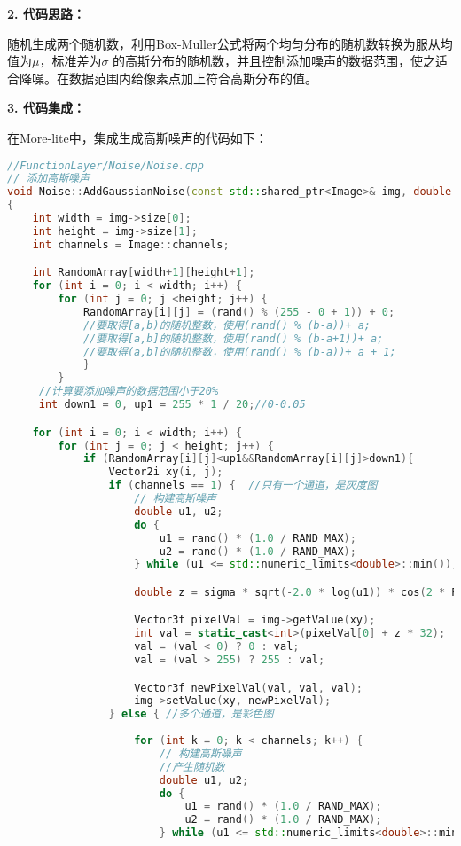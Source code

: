 \documentclass[lang=cn,10pt]{elegantbook}
\begin{document}
\textcolor{third}{\textbf{2. 代码思路：}}

随机生成两个随机数，利用Box-Muller公式将两个均匀分布的随机数转换为服从均值为$\mu$，标准差为$\sigma$ 的高斯分布的随机数，并且控制添加噪声的数据范围，使之适合降噪\cite{zhihu97905713}。在数据范围内给像素点加上符合高斯分布的值。

\textcolor{third}{\textbf{3. 代码集成：}}

在More-lite中，集成生成高斯噪声的代码如下：
\begin{lstlisting}[language=c++]
//FunctionLayer/Noise/Noise.cpp
// 添加高斯噪声
void Noise::AddGaussianNoise(const std::shared_ptr<Image>& img, double mu, double sigma) 
{
    int width = img->size[0];
    int height = img->size[1];
    int channels = Image::channels;

    int RandomArray[width+1][height+1];
    for (int i = 0; i < width; i++) {
        for (int j = 0; j <height; j++) {
			RandomArray[i][j] = (rand() % (255 - 0 + 1)) + 0;
			//要取得[a,b)的随机整数，使用(rand() % (b-a))+ a;   			
			//要取得[a,b]的随机整数，使用(rand() % (b-a+1))+ a;   			
			//要取得(a,b]的随机整数，使用(rand() % (b-a))+ a + 1;   		
		    }
	    }
     //计算要添加噪声的数据范围小于20%
     int down1 = 0, up1 = 255 * 1 / 20;//0-0.05

    for (int i = 0; i < width; i++) {
        for (int j = 0; j < height; j++) {
            if (RandomArray[i][j]<up1&&RandomArray[i][j]>down1){
                Vector2i xy(i, j);            
                if (channels == 1) {  //只有一个通道，是灰度图
                    // 构建高斯噪声
                    double u1, u2;
                    do {
                        u1 = rand() * (1.0 / RAND_MAX);
                        u2 = rand() * (1.0 / RAND_MAX);
                    } while (u1 <= std::numeric_limits<double>::min()); // u1不能为0

                    double z = sigma * sqrt(-2.0 * log(u1)) * cos(2 * PI * u2) + mu;

                    Vector3f pixelVal = img->getValue(xy);
                    int val = static_cast<int>(pixelVal[0] + z * 32);
                    val = (val < 0) ? 0 : val;
                    val = (val > 255) ? 255 : val;

                    Vector3f newPixelVal(val, val, val);
                    img->setValue(xy, newPixelVal);
                } else { //多个通道，是彩色图
        
                    for (int k = 0; k < channels; k++) {
                        // 构建高斯噪声
                        //产生随机数
                        double u1, u2;
                        do {
                            u1 = rand() * (1.0 / RAND_MAX);
                            u2 = rand() * (1.0 / RAND_MAX);
                        } while (u1 <= std::numeric_limits<double>::min()); // u1不能为0


\end{lstlisting}
\end{document}
